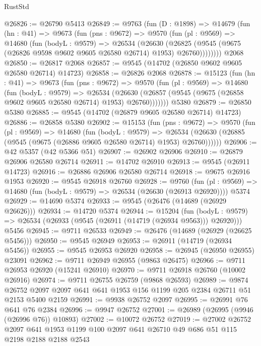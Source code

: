 \begin{lexlean}{RustStd}
\begin{coremodule}
@26826 := @26790 @5413
@26849 := @9763
    (fun (D : @1898) =>
    @14679
      (fun (hn : @41) =>
      @9673
        (fun (pns : @9672) =>
        @9570
          (fun (pl : @9569) =>
          @14680
            (fun (bodyL : @9579) =>
            @26534
              (@26630
                (@26825 (@9545 (@9675 (@26826 @9598 @9602 @9605 @26580 @26714) @1953) @26760))))))))
    @2068
@26850 := @26817 @2068
@26857 := @9545 (@14702 (@26850 @9602 @9605 @26580 @26714) @14723)
@26858 := @26826 @2068
@26878 := @15123
    (fun (hn : @41) =>
    @9673
      (fun (pns : @9672) =>
      @9570
        (fun (pl : @9569) =>
        @14680
          (fun (bodyL : @9579) =>
          @26534
            (@26630 (@26857 (@9545 (@9675 (@26858 @9602 @9605 @26580 @26714) @1953) @26760)))))))
    @5380
@26879 := @26850 @5380
@26885 := @9545 (@14702 (@26879 @9605 @26580 @26714) @14723)
@26886 := @26858 @5380
@26902 := @15153
    (fun (pns : @9672) =>
    @9570
      (fun (pl : @9569) =>
      @14680
        (fun (bodyL : @9579) =>
        @26534 (@26630 (@26885 (@9545 (@9675 (@26886 @9605 @26580 @26714) @1953) @26760))))))
@26906 := @42 @5357 (@42 @5366 @51)
@26907 := @26902 @26906
@26910 := @26879 @26906 @26580 @26714
@26911 := @14702 @26910
@26913 := @9545 (@26911 @14723)
@26916 := @26886 @26906 @26580 @26714
@26918 := @9675 @26916 @1953
@26920 := @9545 @26918 @26760
@26928 := @9760
    (fun (pl : @9569) => @14680 (fun (bodyL : @9579) => @26534 (@26630 (@26913 @26920))))
    @5374
@26929 := @14690 @5374
@26933 := @9545 (@26476 (@14689 (@26929 @26626)))
@26934 := @14720 @5374
@26944 := @15204
    (fun (bodyL : @9579) => @26534 (@26933 (@9545 (@26911 (@14719 (@26934 @9563))) @26920)))
    @5456
@26945 := @9711 @26533
@26949 := @26476 (@14689 (@26929 (@26625 @5456)))
@26950 := @9545 @26949
@26953 := @26911 (@14719 (@26934 @5456))
@26955 := @9545 @26953 @26920
@26958 := @26945 (@26950 @26955) @23091
@26962 := @9711 @26949 @26955 (@9863 @26475)
@26966 := @9711 @26953 @26920 (@15241 @26910)
@26970 := @9711 @26918 @26760 (@10002 @26916)
@26974 := @9711 @26755 @26759 (@9868 @26593)
@26989 := @9874
    @26752
    @2097
    @2097
    @641
    @641
    @1953
    @156
    @1199
    @205
    @2384
    @26711
    @51
    @2153
    @5400
    @2159
@26991 := @9938 @26752 @2097
@26995 := @26991 @76 @641 @76 @2384
@26996 := @9947 @26752
@27001 := @26989 (@26995 (@9946 (@26996 @76)) @10893)
@27002 := @10072 @26752
@27019 := @27002
    @26752
    @2097
    @641
    @1953
    @1199
    @100
    @2097
    @641
    @26710
    @49
    @686
    @51
    @115
    @2198
    @2188
    @2188
    @2543

\end{coremodule}
\end{lexlean}
